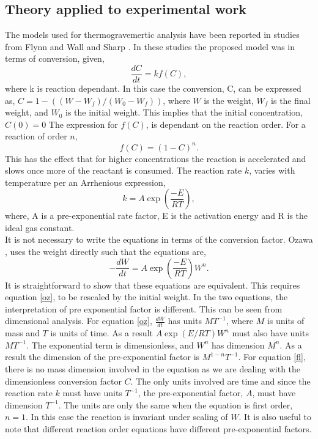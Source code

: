 \subsection{Theory applied to experimental work}
The models used for thermogravemertic analysis have been reported in studies from Flynn and Wall \cite{flynn66} and Sharp \cite{sharp69}. In these studies the proposed model was in terms of conversion, given,
\begin{equation}
\frac{dC}{dt}=kf(C), \label{fl}
\end{equation}
where k is reaction dependant. In this case the conversion, C, can be expressed as, $C=1-\left(\left(W-W_f\right)/\left(W_0-W_f\right)\right)$, where $W$ is the weight, $W_f$ is the final weight, and $W_0$ is the initial weight. This implies that the initial concentration, $C(0)=0$ The expression for $f(C)$, is dependant on the reaction order. For a reaction of order $n$,
\begin{equation}
f(C)=(1-C)^n.
\end{equation}
This has the effect that for higher concentrations the reaction is accelerated and slows once more of the reactant is consumed. The reaction rate $k$, varies with temperature per an Arrhenious expression, \\
\begin{equation}
k=A\exp\left(\frac{-E}{RT}\right),
\end{equation}
where, A is a pre-exponential rate factor, E is the activation energy and R is the ideal gas constant.\\
It is not necessary to write the equations in terms of the conversion factor. Ozawa \cite{ozawa65}, uses the weight directly such that the equations are,
\begin{equation}
-\frac{dW}{dt}=A\exp\left(\frac{-E}{RT}\right) W^n. \label{oz}
\end{equation} 
It is straightforward to show that these equations are equivalent. This requires equation \eqref{oz}, to be rescaled by the initial weight. In the two equations, the interpretation of pre exponential factor is different. This can be seen from dimensional analysis. For equation \eqref{oz}, $\frac{dW}{dt}$ has units $MT^{-1}$, where $M$ is units of mass and $T$ is units of time. As a result $A\exp(E/RT)W^n$ must also have units $MT^{-1}$. The exponential term is dimensionless, and $W^n$ has dimension $M^n$. As a result the dimension of the pre-exponential factor is $M^{1-n}T^{-1}$. For equation \eqref{fl}, there is no mass dimension involved in the equation as we are dealing with the dimensionless conversion factor $C$. The only units involved are time and since the reaction rate $k$ must have units $T^{-1}$, the pre-exponential factor, $A$, must have dimension $T^{-1}$. The units are only the same when the equation is first order, $n=1$. In this case the reaction is invariant under scaling of $W$. It is also useful to note that different reaction order equations have different pre-exponential factors.
